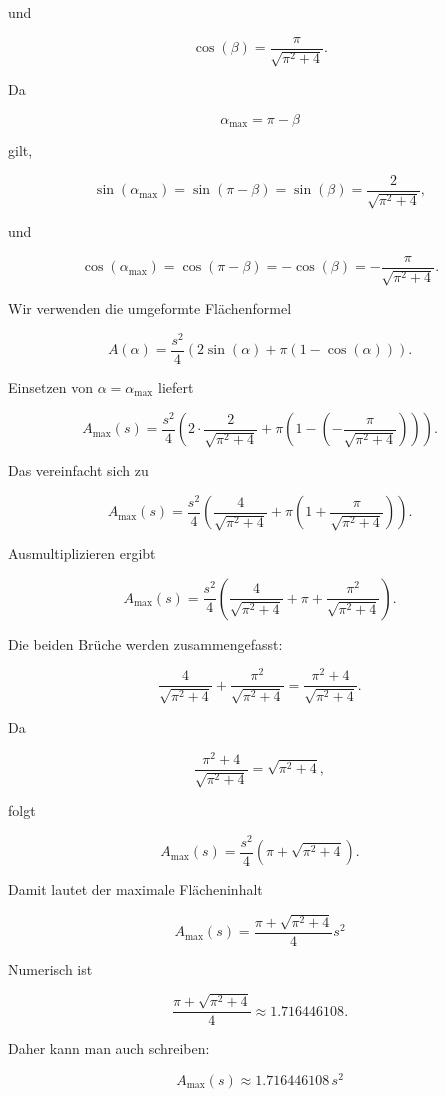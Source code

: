 und

\[
\cos(\beta)
=
\frac{\pi}{\sqrt{\pi^2+4}}.
\]

Da

\[
\alpha_\text{max}=\pi-\beta
\]

gilt,

\[
\sin(\alpha_\text{max})
=
\sin(\pi-\beta)
=
\sin(\beta)
=
\frac{2}{\sqrt{\pi^2+4}},
\]

und

\[
\cos(\alpha_\text{max})
=
\cos(\pi-\beta)
=
-\cos(\beta)
=
-\frac{\pi}{\sqrt{\pi^2+4}}.
\]

Wir verwenden die umgeformte Flächenformel

\[
A(\alpha)
=
\frac{s^2}{4}
\left(
2\sin(\alpha)
+
\pi
\left(
1-\cos(\alpha)
\right)
\right).
\]

Einsetzen von \(\alpha=\alpha_\text{max}\) liefert

\[
A_\text{max}(s)
=
\frac{s^2}{4}
\left(
2\cdot
\frac{2}{\sqrt{\pi^2+4}}
+
\pi
\left(
1-
\left(
-\frac{\pi}{\sqrt{\pi^2+4}}
\right)
\right)
\right).
\]

Das vereinfacht sich zu

\[
A_\text{max}(s)
=
\frac{s^2}{4}
\left(
\frac{4}{\sqrt{\pi^2+4}}
+
\pi
\left(
1+
\frac{\pi}{\sqrt{\pi^2+4}}
\right)
\right).
\]

Ausmultiplizieren ergibt

\[
A_\text{max}(s)
=
\frac{s^2}{4}
\left(
\frac{4}{\sqrt{\pi^2+4}}
+
\pi
+
\frac{\pi^2}{\sqrt{\pi^2+4}}
\right).
\]

Die beiden Brüche werden zusammengefasst:

\[
\frac{4}{\sqrt{\pi^2+4}}
+
\frac{\pi^2}{\sqrt{\pi^2+4}}
=
\frac{\pi^2+4}{\sqrt{\pi^2+4}}.
\]

Da

\[
\frac{\pi^2+4}{\sqrt{\pi^2+4}}
=
\sqrt{\pi^2+4},
\]

folgt

\[
A_\text{max}(s)
=
\frac{s^2}{4}
\left(
\pi
+
\sqrt{\pi^2+4}
\right).
\]

Damit lautet der maximale Flächeninhalt

\[
\boxed{
A_\text{max}(s)
=
\frac{\pi+\sqrt{\pi^2+4}}{4}
s^2
}
\]

Numerisch ist

\[
\frac{\pi+\sqrt{\pi^2+4}}{4}
\approx
1.716446108.
\]

Daher kann man auch schreiben:

\[
\boxed{
A_\text{max}(s)
\approx
1.716446108\,s^2
}
\]


